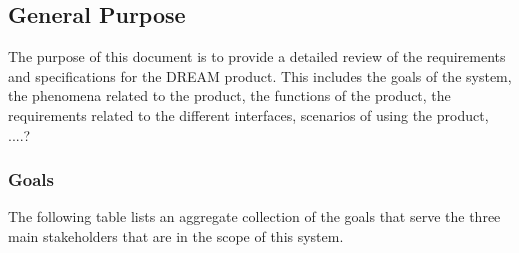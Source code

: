 \begin{flushleft}
\subsection{General Purpose}
The purpose of this document is to provide a detailed review of the requirements and specifications for the DREAM product. This includes the goals of the system, the phenomena related to the product, the functions of the product, the requirements related to the different interfaces, scenarios of using the product, ....?
\end{flushleft}



\subsubsection{Goals}
The following table lists an aggregate collection of the goals that serve the three main stakeholders that are in the scope of this system.


